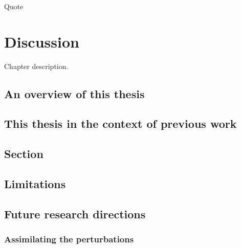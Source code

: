 \begin{savequote}[8cm]
    Quote
\end{savequote}
    
\chapter{\label{discussion}Discussion} 

Chapter description.

\minitoc

\clearpage

\section{An overview of this thesis}

  \blindtext

\section{This thesis in the context of previous work}

  \blindtext

\section{Section}

  \blindtext

\section{Limitations}

  \blindtext

\section{Future research directions}

  \subsection{Assimilating the perturbations}

